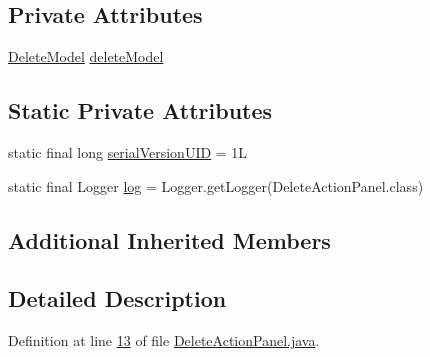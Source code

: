 \subsection*{Private Attributes}
\begin{DoxyCompactItemize}
\item 
\hyperlink{classcom_1_1poly_1_1nlp_1_1filekommander_1_1views_1_1models_1_1_delete_model}{Delete\-Model} \hyperlink{classcom_1_1poly_1_1nlp_1_1filekommander_1_1views_1_1panels_1_1_delete_action_panel_a17228ab26020f99bdef1f28e0d525d39}{delete\-Model}
\end{DoxyCompactItemize}
\subsection*{Static Private Attributes}
\begin{DoxyCompactItemize}
\item 
static final long \hyperlink{classcom_1_1poly_1_1nlp_1_1filekommander_1_1views_1_1panels_1_1_delete_action_panel_a1f7b0dccb1eaac83b09874cb95feb7cc}{serial\-Version\-U\-I\-D} = 1\-L
\item 
static final Logger \hyperlink{classcom_1_1poly_1_1nlp_1_1filekommander_1_1views_1_1panels_1_1_delete_action_panel_a01ad2752427baebc7718fbea69537476}{log} = Logger.\-get\-Logger(Delete\-Action\-Panel.\-class)
\end{DoxyCompactItemize}
\subsection*{Additional Inherited Members}


\subsection{Detailed Description}


Definition at line \hyperlink{L13}{13} of file \hyperlink{}{Delete\-Action\-Panel.\-java}.



